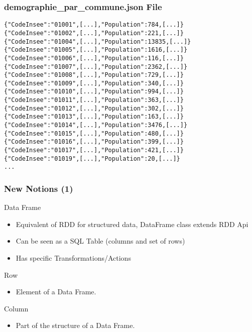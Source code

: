 \documentclass[slidetop,9pt,utf8]{beamer}
\begin{document}
\begin{CJK}{UTF8}{gbsn}
\begin{frame}
\end{frame}

\begin{frame}[fragile]
  \frametitle{demographie\_par\_commune.json File}

  \begin{verbatim}
{"CodeInsee":"01001",[...],"Population":784,[...]}
{"CodeInsee":"01002",[...],"Population":221,[...]}
{"CodeInsee":"01004",[...],"Population":13835,[...]}
{"CodeInsee":"01005",[...],"Population":1616,[...]}
{"CodeInsee":"01006",[...],"Population":116,[...]}
{"CodeInsee":"01007",[...],"Population":2362,[...]}
{"CodeInsee":"01008",[...],"Population":729,[...]}
{"CodeInsee":"01009",[...],"Population":340,[...]}
{"CodeInsee":"01010",[...],"Population":994,[...]}
{"CodeInsee":"01011",[...],"Population":363,[...]}
{"CodeInsee":"01012",[...],"Population":302,[...]}
{"CodeInsee":"01013",[...],"Population":163,[...]}
{"CodeInsee":"01014",[...],"Population":3476,[...]}
{"CodeInsee":"01015",[...],"Population":480,[...]}
{"CodeInsee":"01016",[...],"Population":399,[...]}
{"CodeInsee":"01017",[...],"Population":421,[...]}
{"CodeInsee":"01019",[...],"Population":20,[...]}
...
  \end{verbatim}
\end{frame}

\begin{frame}
  \frametitle{New Notions (1)}

  \begin{block}{Data Frame}
    \begin{itemize}
      \item Equivalent of RDD for structured data, DataFrame class extends RDD Api
      \item Can be seen as a SQL Table (columns and set of rows)
      \item Has specific Transformations/Actions
    \end{itemize}
  \end{block}

  \begin{block}{Row}
    \begin{itemize}
      \item Element of a Data Frame.
    \end{itemize}
  \end{block}

  \begin{block}{Column}
    \begin{itemize}
      \item Part of the structure of a Data Frame.
    \end{itemize}
  \end{block}


\end{frame}
\end{CJK}
\end{document}
